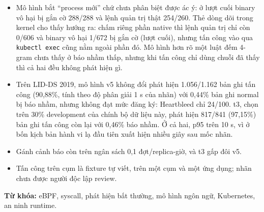 \begin{itemize}
\tightlist
\item
  Mô hình bắt ``process mới'' chứ chưa phân biệt được ác ý: ở lượt cuối binary vô hại bị gắn cờ 288/288 và lệnh quản trị thật 254/260. Thẻ dòng dõi trong kernel cho thấy hướng ra: chấm riêng phần native thì lệnh quản trị chỉ còn 0/606 và binary vô hại 1/672 bị gắn cờ (lượt cuối), nhưng tấn công vào qua \texttt{kubectl exec} cũng nằm ngoài phần đó. Mô hình hơn rõ một luật đếm 4-gram chưa thấy ở báo nhầm thấp, nhưng khi tấn công chỉ dùng chuỗi đã thấy thì cả hai đều không phát hiện gì.
\item
  Trên LID-DS 2019, mô hình v5 không đổi phát hiện 1.056/1.162 bản ghi tấn công (90,88\%, tính theo độ phân giải 1 s của nhãn) với 0,44\% bản ghi normal bị báo nhầm, nhưng không đạt mức đăng ký: Heartbleed chỉ 24/100. t3, chọn trên 30\% development của chính bộ dữ liệu này, phát hiện 817/841 (97,15\%) bản ghi tấn công còn lại với 0,46\% báo nhầm. Ở cả hai, p95 trên 10 s, vì ở bốn kịch bản hành vi lạ đầu tiên xuất hiện nhiều giây sau mốc nhãn.
\item
  Gánh cảnh báo còn trên ngân sách 0,1 đợt/replica-giờ, và t3 gấp đôi v5.
\item
  Tấn công trên cụm là fixture tự viết, trên một cụm và một ứng dụng; nhãn chưa được người độc lập review.
\end{itemize}

\textbf{Từ khóa:} eBPF, syscall, phát hiện bất thường, mô hình ngôn ngữ, Kubernetes, an ninh runtime.
